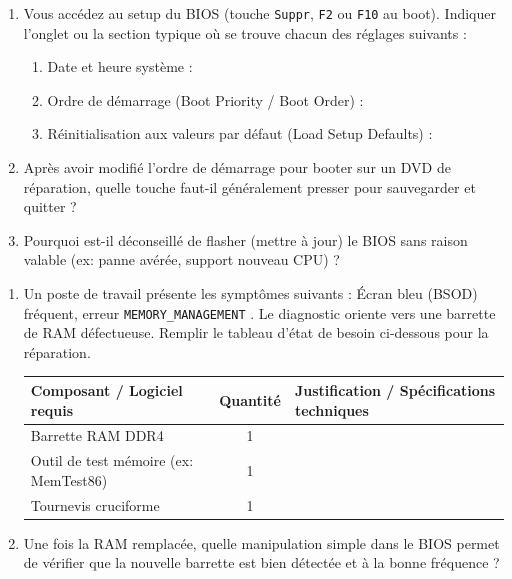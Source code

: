 \documentclass[11pt]{article}
\begin{document}
\begin{exercice}
\begin{enumerate}
    \item Vous accédez au setup du BIOS (touche \texttt{Suppr}, \texttt{F2} ou \texttt{F10} au boot). Indiquer l'onglet ou la section typique où se trouve chacun des réglages suivants :
    \begin{enumerate}
        \item Date et heure système : \underline{\hspace{5cm}}
        \item Ordre de démarrage (Boot Priority / Boot Order) : \underline{\hspace{5cm}}
        \item Réinitialisation aux valeurs par défaut (Load Setup Defaults) : \underline{\hspace{5cm}}
    \end{enumerate}
    \item Après avoir modifié l'ordre de démarrage pour booter sur un DVD de réparation, quelle touche faut-il généralement presser pour sauvegarder et quitter ? \underline{\hspace{3cm}}
    \item Pourquoi est-il déconseillé de flasher (mettre à jour) le BIOS sans raison valable (ex: panne avérée, support nouveau CPU) ?
\end{enumerate}
\end{exercice}

\begin{exercice}
\begin{enumerate}
    \item Un poste de travail présente les symptômes suivants : \og Écran bleu (BSOD) fréquent, erreur \texttt{MEMORY\_MANAGEMENT} \fg{}. Le diagnostic oriente vers une barrette de RAM défectueuse. Remplir le tableau d'état de besoin ci-dessous pour la réparation.
    \begin{tabularx}{\linewidth}{|X|c|X|}
    \hline
    \textbf{Composant / Logiciel requis} & \textbf{Quantité} & \textbf{Justification / Spécifications techniques} \\
    \hline
    Barrette RAM DDR4 & 1 & \underline{\hspace{6cm}} \\
    \hline
    Outil de test mémoire (ex: MemTest86) & 1 & \underline{\hspace{6cm}} \\
    \hline
    Tournevis cruciforme & 1 & \underline{\hspace{6cm}} \\
    \hline
    \end{tabularx}
    \item Une fois la RAM remplacée, quelle manipulation simple dans le BIOS permet de vérifier que la nouvelle barrette est bien détectée et à la bonne fréquence ?
\end{enumerate}
\end{exercice}
\end{document}
